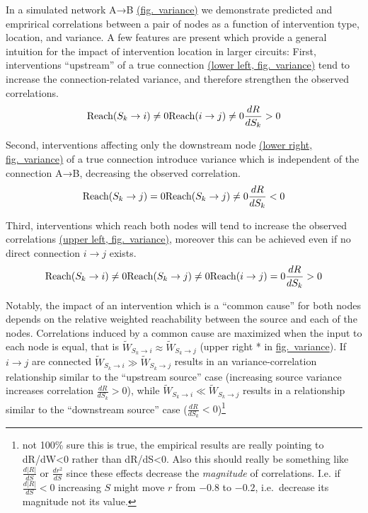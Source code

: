 In a simulated network A→B \protect\hyperlink{fig-var}{(fig.~variance)}
we demonstrate predicted and emprirical correlations between a pair of
nodes as a function of intervention type, location, and variance. A few
features are present which provide a general intuition for the impact of
intervention location in larger circuits: First, interventions
``upstream'' of a true connection \protect\hyperlink{fig-var}{(lower
left, fig.~variance)} tend to increase the connection-related variance,
and therefore strengthen the observed correlations.
\[\text{Reach}(S_k\rightarrow i) \neq 0 \\ \text{Reach}(i\rightarrow j) \neq 0 \\ \frac{dR}{dS_k} > 0\]

Second, interventions affecting only the downstream node
\protect\hyperlink{fig-var}{(lower right, fig.~variance)} of a true
connection introduce variance which is independent of the connection
A→B, decreasing the observed correlation.
\[\text{Reach}(S_k \rightarrow  j) = 0 \\ \text{Reach}(S_k \rightarrow  j) \neq 0 \\ \frac{dR}{dS_k} < 0\]

Third, interventions which reach both nodes will tend to increase the
observed correlations \protect\hyperlink{fig-var}{(upper left,
fig.~variance)}, moreover this can be achieved even if no direct
connection \(i\rightarrow j\) exists.
\[\text{Reach}(S_k \rightarrow  i) \neq 0 \\ \text{Reach}(S_k \rightarrow  j) \neq 0 \\ \text{Reach}(i \rightarrow  j) = 0 \\ \frac{dR}{dS_k} > 0\]

Notably, the impact of an intervention which is a ``common cause'' for
both nodes depends on the relative weighted reachability between the
source and each of the nodes. Correlations induced by a common cause are
maximized when the input to each node is equal, that is
\(\widetilde{W}_{S_k\rightarrow i} \approx \widetilde{W}_{S_k\rightarrow j}\) (upper right *
in \protect\hyperlink{fig-var}{fig.~variance}). If \(i\rightarrow j\) are connected
\(\widetilde{W}_{S_k\rightarrow i} \gg \widetilde{W}_{S_k\rightarrow j}\) results in an
variance-correlation relationship similar to the ``upstream source''
case (increasing source variance increases correlation
\(\frac{dR}{dS_k} > 0\)), while
\(\widetilde{W}_{S_k\rightarrow i} \ll \widetilde{W}_{S_k\rightarrow j}\) results in a
relationship similar to the ``downstream source'' case
(\(\frac{dR}{dS_k} < 0\))\footnote{not 100\% sure this is true, the
  empirical results are really pointing to dR/dW\textless0 rather than
  dR/dS\textless0. Also this should really be something like
  \(\frac{d|R|}{dS}\) or \(\frac{dr^2}{dS}\) since these effects
  decrease the \emph{magnitude} of correlations. I.e. if
  \(\frac{d|R|}{dS} < 0\) increasing \(S\) might move \(r\) from
  \(-0.8\) to \(-0.2\), i.e.~decrease its magnitude not its value.}

